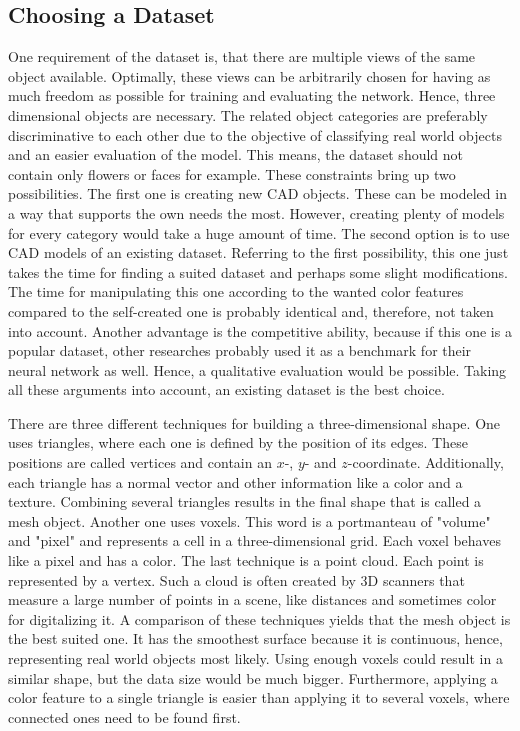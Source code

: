 \subsection{Choosing a Dataset}
\label{sec:dataset-choosing}
One requirement of the dataset is, that there are multiple views of the same object available.
Optimally, these views can be arbitrarily chosen for having as much freedom as possible for training and evaluating the network.
Hence, three dimensional objects are necessary.
The related object categories are preferably discriminative to each other due to the objective of classifying real world objects and an easier evaluation of the model.
This means, the dataset should not contain only flowers or faces for example.
These constraints bring up two possibilities.
The first one is creating new CAD objects.
These can be modeled in a way that supports the own needs the most.
However, creating plenty of models for every category would take a huge amount of time.
The second option is to use CAD models of an existing dataset.
Referring to the first possibility, this one just takes the time for finding a suited dataset and perhaps some slight modifications.
The time for manipulating this one according to the wanted color features compared to the self-created one is probably identical and, therefore, not taken into account.
Another advantage is the competitive ability, because if this one is a popular dataset, other researches probably used it as a benchmark for their neural network as well.
Hence, a qualitative evaluation would be possible.
Taking all these arguments into account, an existing dataset is the best choice.

There are three different techniques for building a three-dimensional shape.
One uses triangles, where each one is defined by the position of its edges.
These positions are called vertices and contain an $x$-, $y$- and $z$-coordinate.
Additionally, each triangle has a normal vector and other information like a color and a texture.
Combining several triangles results in the final shape that is called a mesh object.
Another one uses voxels.
This word is a portmanteau of "volume" and "pixel" and represents a cell in a three-dimensional grid.
Each voxel behaves like a pixel and has a color.
The last technique is a point cloud.
Each point is represented by a vertex.
Such a cloud is often created by 3D scanners that measure a large number of points in a scene, like distances and sometimes color for digitalizing it.
A comparison of these techniques yields that the mesh object is the best suited one.
It has the smoothest surface because it is continuous, hence, representing real world objects most likely.
Using enough voxels could result in a similar shape, but the data size would be much bigger.
Furthermore, applying a color feature to a single triangle is easier than applying it to several voxels, where connected ones need to be found first.

